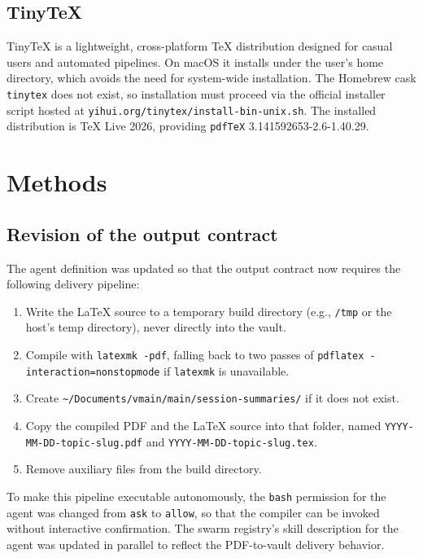 \documentclass[11pt]{article}
\begin{document}
\subsection{TinyTeX}
\label{sec:tinytex}

TinyTeX is a lightweight, cross-platform \TeX{} distribution designed for casual users and automated pipelines. On macOS it installs under the user's home directory, which avoids the need for system-wide installation. The Homebrew cask \texttt{tinytex} does not exist, so installation must proceed via the official installer script hosted at \texttt{yihui.org/tinytex/install-bin-unix.sh}. The installed distribution is TeX Live 2026, providing \texttt{pdfTeX} 3.141592653-2.6-1.40.29.

\section{Methods}
\label{sec:methods}

\subsection{Revision of the output contract}
\label{sec:contract}

The agent definition was updated so that the output contract now requires the following delivery pipeline:

\begin{enumerate}
  \item Write the \LaTeX{} source to a temporary build directory (e.g., \texttt{/tmp} or the host's temp directory), never directly into the vault.
  \item Compile with \texttt{latexmk -pdf}, falling back to two passes of \texttt{pdflatex -interaction=nonstopmode} if \texttt{latexmk} is unavailable.
  \item Create \texttt{\textasciitilde/Documents/vmain/main/session-summaries/} if it does not exist.
  \item Copy the compiled PDF and the \LaTeX{} source into that folder, named \texttt{YYYY-MM-DD-\allowbreak topic-slug.pdf} and \texttt{YYYY-MM-DD-\allowbreak topic-slug.tex}.
  \item Remove auxiliary files from the build directory.
\end{enumerate}

To make this pipeline executable autonomously, the \texttt{bash} permission for the agent was changed from \texttt{ask} to \texttt{allow}, so that the compiler can be invoked without interactive confirmation. The swarm registry's skill description for the agent was updated in parallel to reflect the PDF-to-vault delivery behavior.
\end{document}
